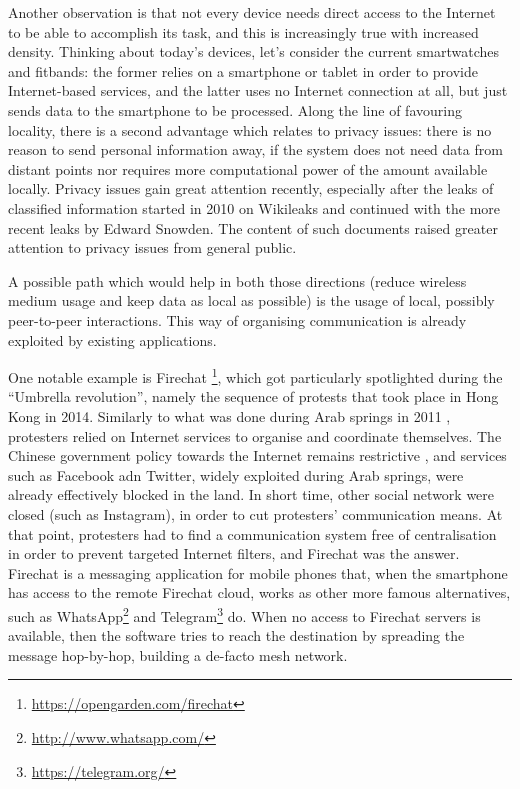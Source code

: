 \documentclass[12pt,a4paper,twoside,openright]{book}
\begin{document}
Another observation is that not every device needs direct access to the Internet to be able to accomplish its task, and this is increasingly true with increased density.
%
Thinking about today's devices, let's consider the current smartwatches and fitbands: the former relies on a smartphone or tablet in order to provide Internet-based services, and the latter uses no Internet connection at all, but just sends data to the smartphone to be processed.
%
Along the line of favouring locality, there is a second advantage which relates to privacy issues: there is no reason to send personal information away, if the system does not need data from distant points nor requires more computational power of the amount available locally.
%
Privacy issues gain great attention recently, especially after the leaks of classified information started in 2010 on Wikileaks and continued with the more recent leaks by Edward Snowden.
%
The content of such documents raised greater attention to privacy issues from general public.

A possible path which would help in both those directions (reduce wireless medium usage and keep data as local as possible) is the usage of local, possibly peer-to-peer interactions.
%
This way of organising communication is already exploited by existing applications.

One notable example is Firechat \footnote{\url{https://opengarden.com/firechat}}, which got particularly spotlighted during the ``Umbrella revolution'', namely the sequence of protests that took place in Hong Kong in 2014.
%
Similarly to what was done during Arab springs in 2011 \cite{arab-spring}, protesters relied on Internet services to organise and coordinate themselves.
%
The Chinese government policy towards the Internet remains restrictive \cite{china-censorship}, and services such as Facebook adn Twitter, widely exploited during Arab springs, were already effectively blocked in the land.
%
In short time, other social network were closed (such as Instagram), in order to cut protesters' communication means.
%
At that point, protesters had to find a communication system free of centralisation in order to prevent targeted Internet filters, and Firechat was the answer.
%
Firechat is a messaging application for mobile phones that, when the smartphone has access to the remote Firechat cloud, works as other more famous alternatives, such as WhatsApp\footnote{\url{http://www.whatsapp.com/}} and Telegram\footnote{\url{https://telegram.org/}} do.
%
When no access to Firechat servers is available, then the software tries to reach the destination by spreading the message hop-by-hop, building a de-facto mesh network.
\end{document}
